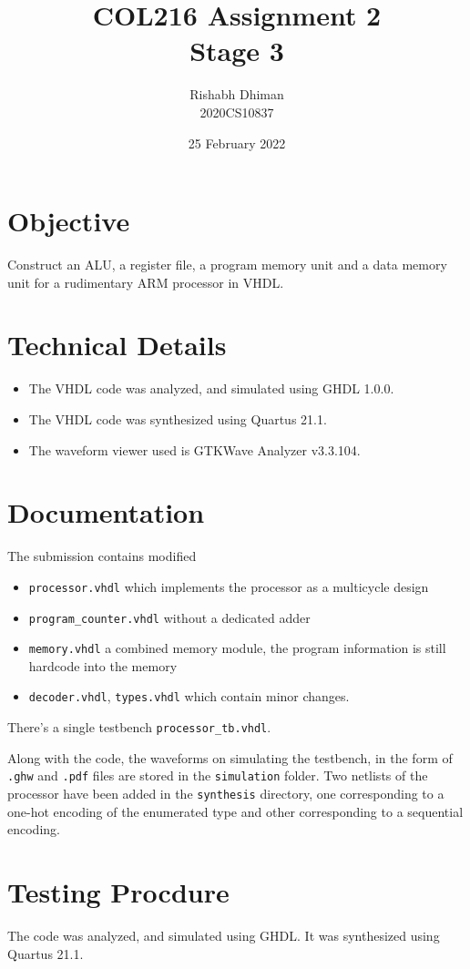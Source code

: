 \documentclass[a4paper]{scrartcl}
\title{COL216 Assignment 2\\{\Large Stage 3}}
\date{25 February 2022}
\author{Rishabh Dhiman\\ 2020CS10837}
\renewcommand{\tt}{\texttt}
\begin{document}
\maketitle

\section{Objective}
Construct an ALU, a register file, a program memory unit and a data memory unit for a rudimentary ARM processor in VHDL.

\section{Technical Details}
\begin{itemize}
	\item The VHDL code was analyzed, and simulated using GHDL 1.0.0.
	\item The VHDL code was synthesized using Quartus 21.1.
	\item The waveform viewer used is GTKWave Analyzer v3.3.104.
\end{itemize}

\section{Documentation}
The submission contains modified
\begin{itemize}
	\item \tt{processor.vhdl} which implements the processor as a multicycle design
	\item \tt{program_counter.vhdl} without a dedicated adder
	\item \tt{memory.vhdl} a combined memory module, the program information is still hardcode into the memory
	\item \tt{decoder.vhdl}, \tt{types.vhdl} which contain minor changes.
\end{itemize}
There's a single testbench \tt{processor_tb.vhdl}.

Along with the code, the waveforms on simulating the testbench, in the form of \tt{.ghw} and \tt{.pdf} files are stored in the \tt{simulation} folder. Two netlists of the processor have been added in the \tt{synthesis} directory, one corresponding to a one-hot encoding of the enumerated type and other corresponding to a sequential encoding.

\section{Testing Procdure}
The code was analyzed, and simulated using GHDL. It was synthesized using Quartus 21.1.
\end{document}
